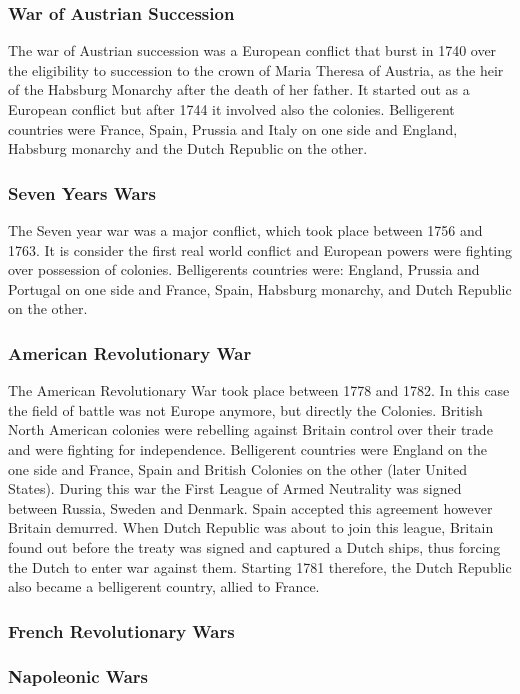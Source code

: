 \documentclass[12pt,a4paper,titlepage,english]{article}
\begin{document}
\subsubsection{War of Austrian Succession}
The war of Austrian succession was a European conflict that burst in 1740 over the eligibility to succession to the crown of Maria Theresa of Austria, as the heir of the Habsburg Monarchy after the death of her father. It started out as a European conflict but after 1744 it involved also the colonies. Belligerent countries were France, Spain, Prussia and Italy on one side and England, Habsburg monarchy and the Dutch Republic on the other. 

\subsubsection{Seven Years Wars}
The Seven year war was a major conflict, which took place between 1756 and 1763. It is consider the first real world conflict and European powers were fighting over possession of colonies. Belligerents countries were: England, Prussia and Portugal on one side and France, Spain, Habsburg monarchy, and Dutch Republic on the other. 

\subsubsection{American Revolutionary War}
The American Revolutionary War took place between 1778 and 1782. In this case the field of battle was not Europe anymore, but directly the Colonies. British North American colonies were rebelling against Britain control over their trade and were fighting for independence. Belligerent countries were England on the one side and France, Spain and British Colonies on the other (later United States). During this war the First League of Armed Neutrality was signed between Russia, Sweden and Denmark. Spain accepted this agreement however Britain demurred. When Dutch Republic was about to join this league, Britain found out before the treaty was signed and captured a Dutch ships, thus forcing the Dutch to enter war against them. Starting 1781 therefore, the Dutch Republic also became a belligerent country, allied to France. 

\subsubsection{French Revolutionary Wars}


\subsubsection{Napoleonic Wars}
\end{document}
